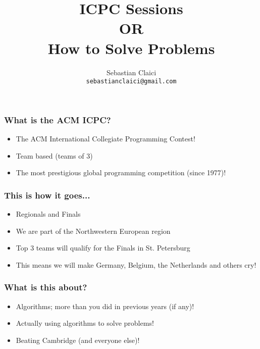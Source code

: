 \documentclass{beamer}
\title{ICPC Sessions \\
    OR \\
    How to Solve Problems
}
\author{Sebastian Claici \\
    \texttt{sebastianclaici@gmail.com}
}
\begin{document}
\maketitle

\begin{frame}
    \frametitle{What is the ACM ICPC?}
    \begin{itemize}
            \pause
        \item The ACM International Collegiate Programming Contest!
            \pause
        \item Team based (teams of 3)
            \pause
        \item The most prestigious global programming competition (since 1977)!
    \end{itemize}
\end{frame}

\begin{frame}
    \frametitle{This is how it goes...}
    \begin{itemize}
            \pause
        \item Regionals and Finals
            \pause
        \item We are part of the Northwestern European region
            \pause
	\item Top 3 teams will qualify for the Finals in St. Petersburg
            \pause
        \item This means we will make Germany, Belgium, the Netherlands and others cry!
    \end{itemize}
\end{frame}

\begin{frame}
    \frametitle{What is this about?}
    \begin{itemize}
            \pause
        \item Algorithms; more than you did in previous years (if any)!
            \pause
        \item Actually using algorithms to solve problems!
            \pause
        \item Beating Cambridge (and everyone else)!
    \end{itemize}
\end{frame}
\end{document}
